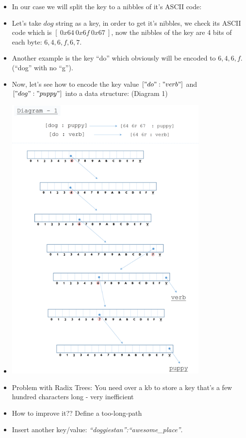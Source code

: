 \documentclass{article}
\begin{document}
\begin{itemize}
\begin{itemize}
\begin{itemize}
          \item In our case we will split the key to a nibbles of it's ASCII code:
          \item Let's take $dog$ string as a key, in order to get it's nibbles, we check its ASCII code which is $[\ 0x64\ 0x6f\ 0x67\ ]$, now the nibbles of 
            the key are 4 bits of each byte: $6, 4, 6, f, 6, 7$.
          \item Another example is the key ``do'' which obviously will be encoded to $6, 4, 6, f$. (``dog'' with no ``g'').
          \item Now, let's see how to encode the key value $["do" : "verb"]$ and $["dog" : "puppy"]$ into a data structure: (Diagram 1)
          \item \includegraphics[width=4in]{trie-post-diagram-1.png}
          \item Problem with Radix Trees: You need over a kb to store a key that's a few hundred characters long - very inefficient
          \item How to improve it?? Define a too-long-path
          \item Insert another key/value: \emph{``doggiestan'':``awesome\_place''}. 

\end{itemize}
\end{itemize}
\end{itemize}
\end{document}

